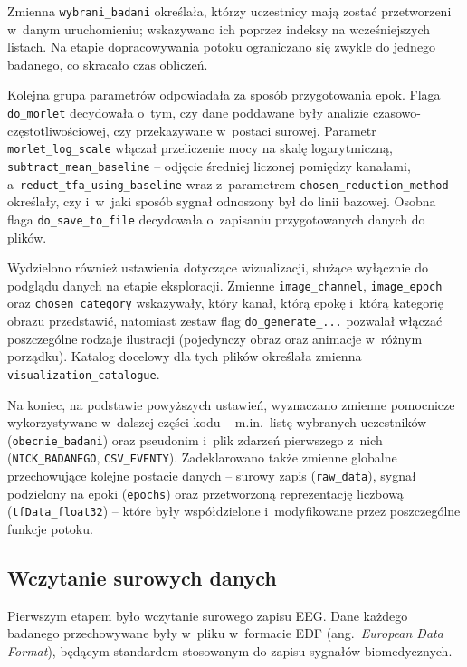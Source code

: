 \documentclass[12pt,a4paper,numbers=enddot,headings=small]{scrartcl} %
\begin{document}
	Zmienna \texttt{wybrani\_badani} określała, którzy uczestnicy mają zostać przetworzeni w~danym uruchomieniu; wskazywano ich poprzez indeksy na wcześniejszych listach. Na etapie dopracowywania potoku ograniczano się
	zwykle do jednego badanego, co skracało czas obliczeń.
	
	Kolejna grupa parametrów odpowiadała za sposób przygotowania epok. Flaga \texttt{do\_morlet} decydowała o~tym, czy dane poddawane były analizie czasowo-częstotliwościowej, czy przekazywane w~postaci surowej. Parametr
	\texttt{morlet\_log\_scale} włączał przeliczenie mocy na skalę logarytmiczną, \texttt{subtract\_mean\_baseline} -- odjęcie średniej liczonej pomiędzy kanałami, a~\texttt{reduct\_tfa\_using\_baseline} wraz z~parametrem
	\texttt{chosen\_reduction\_method} określały, czy i~w~jaki sposób sygnał odnoszony był do linii bazowej. Osobna flaga \texttt{do\_save\_to\_file} decydowała o~zapisaniu przygotowanych danych do plików.
	
	Wydzielono również ustawienia dotyczące wizualizacji, służące wyłącznie do podglądu danych na etapie eksploracji. Zmienne \texttt{image\_channel}, \texttt{image\_epoch} oraz \texttt{chosen\_category} wskazywały, który kanał, którą epokę i~którą kategorię obrazu przedstawić, natomiast zestaw flag \texttt{do\_generate\_...} pozwalał włączać poszczególne rodzaje ilustracji (pojedynczy obraz oraz animacje w~różnym porządku). Katalog docelowy dla tych plików określała zmienna \texttt{visualization\_catalogue}.
	
	Na koniec, na podstawie powyższych ustawień, wyznaczano zmienne pomocnicze wykorzystywane w~dalszej części kodu -- m.in.~listę wybranych uczestników (\texttt{obecnie\_badani}) oraz pseudonim i~plik zdarzeń pierwszego z~nich
	(\texttt{NICK\_BADANEGO}, \texttt{CSV\_EVENTY}). Zadeklarowano także zmienne globalne przechowujące kolejne postacie danych -- surowy zapis (\texttt{raw\_data}), sygnał podzielony na epoki (\texttt{epochs}) oraz przetworzoną reprezentację liczbową (\texttt{tfData\_float32}) -- które były współdzielone i~modyfikowane przez poszczególne funkcje potoku.
	
	\subsection{Wczytanie surowych danych}
	
	Pierwszym etapem było wczytanie surowego zapisu EEG. Dane każdego badanego przechowywane były w~pliku w~formacie EDF (ang.~\textit{European Data Format}), będącym standardem stosowanym do zapisu sygnałów biomedycznych.
	
\end{document}

